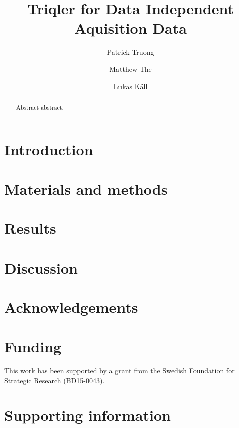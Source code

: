 \documentclass[10pt,letterpaper]{article}
\title{Triqler for Data Independent Aquisition Data}
\author{Patrick Truong \and Matthew The \and Lukas K\"{a}ll}
\begin{document}
\maketitle

\begin{abstract}
  Abstract abstract.  
\end{abstract}
  

\section*{Introduction}

\section*{Materials and methods}

\section*{Results}

\section*{Discussion}

\section*{Acknowledgements}


\section*{Funding}

This work has been supported by a grant from the Swedish Foundation for Strategic Research (BD15-0043).

\section*{Supporting information}



\end{document}
